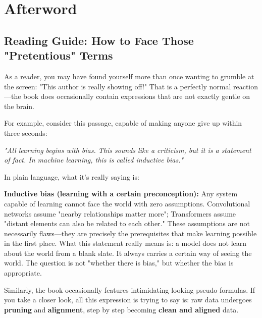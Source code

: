 \chapter*{Afterword}
{}
\thispagestyle{plain}

\section{Reading Guide: How to Face Those "Pretentious" Terms}

As a reader, you may have found yourself more than once wanting to grumble at the screen: "This author is really showing off!" That is a perfectly normal reaction---the book does occasionally contain expressions that are not exactly gentle on the brain.

\vspace{1em}

For example, consider this passage, capable of making anyone give up within three seconds:

\begin{myquote}

\textit{"All learning begins with bias. This sounds like a criticism, but it is a statement of fact. In machine learning, this is called inductive bias."}
\end{myquote}

In plain language, what it's really saying is:

\textbf{Inductive bias (learning with a certain preconception):} Any system capable of learning cannot face the world with zero assumptions. Convolutional networks assume "nearby relationships matter more"; Transformers assume "distant elements can also be related to each other."
These assumptions are not necessarily flaws---they are precisely the prerequisites that make learning possible in the first place. What this statement really means is: a model does not learn about the world from a blank slate. It always carries a certain way of seeing the world. The question is not "whether there is bias," but whether the bias is appropriate.

\vspace{1em}

Similarly, the book occasionally features intimidating-looking pseudo-formulas. If you take a closer look, all this expression is trying to say is: raw data undergoes \textbf{pruning} and \textbf{alignment}, step by step becoming \textbf{clean and aligned} data.

